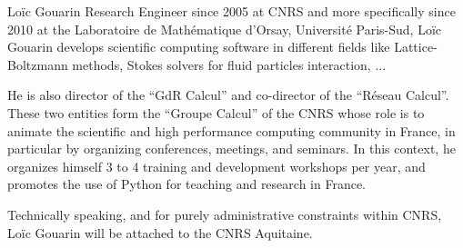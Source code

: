 \begin{participant}[type=R,PM=6,gender=male,salary=5600]{Lo\"ic Gouarin}
  Research Engineer since 2005 at CNRS and more specifically since
  2010 at the Laboratoire de Mathématique d'Orsay, Université
  Paris-Sud, Loïc Gouarin develops scientific computing software in
  different fields like Lattice-Boltzmann methods, Stokes solvers for
  fluid particles interaction, ...

  He is also director of the ``GdR Calcul'' and co-director of the
  ``Réseau Calcul''. These two entities form the ``Groupe Calcul'' of
  the CNRS whose role is to animate the scientific and high
  performance computing community in France, in particular by
  organizing conferences, meetings, and seminars. In this context, he
  organizes himself 3 to 4 training and development workshops per
  year, and promotes the use of Python for teaching and research in
  France.

  Technically speaking, and for purely administrative constraints
  within CNRS, Loïc Gouarin will be attached to the CNRS Aquitaine.
\end{participant}


